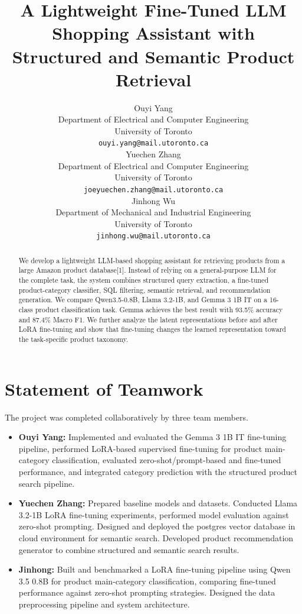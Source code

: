 \documentclass{article}
\title{A Lightweight Fine-Tuned LLM Shopping Assistant with Structured and Semantic Product Retrieval}
\author{%
  {Ouyi Yang}\\
  Department of Electrical and Computer Engineering\\
  University of Toronto\\
  \texttt{{ouyi.yang@mail.utoronto.ca}} \\
  \And
  {Yuechen Zhang}\\
  Department of Electrical and Computer Engineering\\
  University of Toronto\\
  \texttt{{joeyuechen.zhang@mail.utoronto.ca}} \\
  \And
  {Jinhong  Wu}\\
  Department of Mechanical and Industrial Engineering\\
  University of Toronto\\
  \texttt{{jinhong.wu@mail.utoronto.ca}} \\
}
\begin{document}
\maketitle

\begin{abstract}
We develop a lightweight LLM-based shopping assistant for retrieving products
from a large Amazon product database[1]. Instead of relying on a general-purpose
LLM for the complete task, the system combines structured query extraction,
a fine-tuned product-category classifier, SQL filtering, semantic retrieval,
and recommendation generation. We compare Qwen3.5-0.8B, Llama 3.2-1B, and
Gemma 3 1B IT on a 16-class product classification task. Gemma achieves the
best result with 93.5\% accuracy and 87.4\% Macro F1. We further analyze the
latent representations before and after LoRA fine-tuning and show that
fine-tuning changes the learned representation toward the task-specific
product taxonomy.
\end{abstract}


\section*{Statement of Teamwork}

The project was completed collaboratively by three team members.

\begin{itemize}
    \item \textbf{{Ouyi Yang}:}
    Implemented and evaluated the Gemma 3 1B IT fine-tuning pipeline,
    performed LoRA-based supervised fine-tuning for product main-category
    classification, evaluated zero-shot/prompt-based and fine-tuned
    performance, and integrated category prediction with the structured
    product search pipeline.

        \item \textbf{{Yuechen Zhang}:}
    Prepared baseline models and datasets. Conducted Llama 3.2-1B LoRA fine-tuning experiments, performed model evaluation against zero-shot prompting. Designed and deployed the postgres vector database in cloud environment for semantic search. Developed product recommendation generator to combine structured and semantic search results.

        \item \textbf{{Jinhong}:}
    Built and benchmarked a LoRA fine-tuning pipeline using Qwen 3.5 0.8B for product main-category classification, comparing fine-tuned performance against zero-shot prompting strategies. Designed the data preprocessing pipeline and system architecture.
    
\end{itemize}
\end{document}
